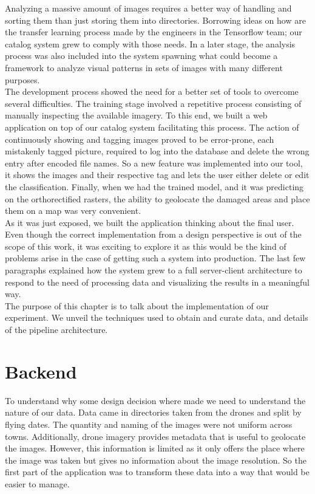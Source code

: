 Analyzing a massive amount of images requires a better way of handling and sorting them than just storing them into directories. Borrowing ideas on how are the transfer learning process made by the engineers in the Tensorflow team; our catalog system grew to comply with those needs. In a later stage, the analysis process was also included into the system spawning what could become a framework to analyze visual patterns in sets of images with many different purposes.\\

The development process showed the need for a better set of tools to overcome several difficulties. The training stage involved a repetitive process consisting of manually inspecting the available imagery. To this end, we built a web application on top of our catalog system facilitating this process. The action of continuously showing and tagging images proved to be error-prone, each mistakenly tagged picture, required to log into the database and delete the wrong entry after encoded file names. So a new feature was implemented into our tool, it shows the images and their respective tag and lets the user either delete or edit the classification. Finally, when we had the trained model, and it was predicting on the orthorectified rasters, the ability to geolocate the damaged areas and place them on a map was very convenient.\\


As it was just exposed, we built the application thinking about the final user. Even though the correct implementation from a design perspective is out of the scope of this work, it was exciting to explore it as this would be the kind of problems arise in the case of getting such a system into production. The last few paragraphs explained how the system grew to a full server-client architecture to respond to the need of processing data and visualizing the results in a meaningful way.\\

The purpose of this chapter is to talk about the implementation of our experiment. We unveil the techniques used to obtain and curate data, and details of the pipeline architecture.\\

\section{Backend}

To understand why some design decision where made we need to understand the nature of our data. Data came in directories taken from the drones and split by flying dates. The quantity and naming of the images were not uniform across towns. Additionally, drone imagery provides metadata that is useful to geolocate the images. However, this information is limited as it only offers the place where the image was taken but gives no information about the image resolution. So the first part of the application was to transform these data into a way that would be easier to manage.\\


